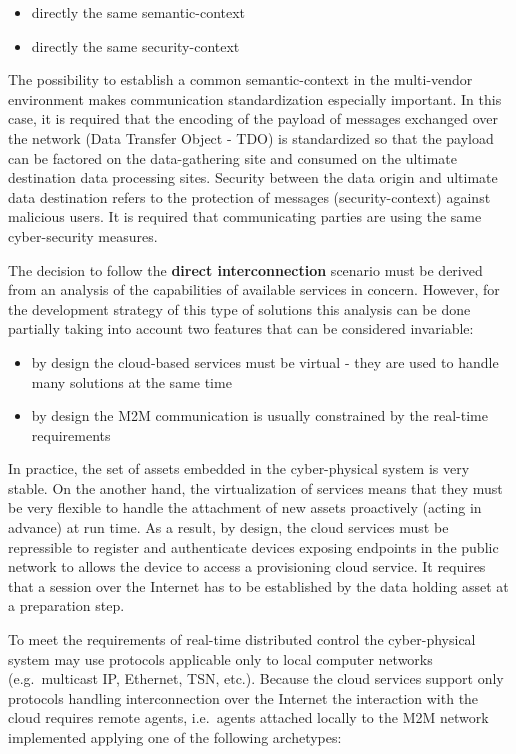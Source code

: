 \documentclass{jacsart}
\providecommand{\tightlist} { \setlength{\itemsep}{0pt}\setlength{\parskip}{0pt}}
\begin{document}
\begin{itemize}
\tightlist
\item
  directly the same semantic-context
\item
  directly the same security-context
\end{itemize}

The possibility to establish a common semantic-context in the
multi-vendor environment makes communication standardization especially
important. In this case, it is required that the encoding of the payload
of messages exchanged over the network (Data Transfer Object - TDO) is
standardized so that the payload can be factored on the data-gathering
site and consumed on the ultimate destination data processing sites.
Security between the data origin and ultimate data destination refers to
the protection of messages (security-context) against malicious users.
It is required that communicating parties are using the same
cyber-security measures.

The decision to follow the \textbf{direct interconnection} scenario must
be derived from an analysis of the capabilities of available services in
concern. However, for the development strategy of this type of solutions
this analysis can be done partially taking into account two features
that can be considered invariable:

\begin{itemize}
\tightlist
\item
  by design the cloud-based services must be virtual - they are used to
  handle many solutions at the same time
\item
  by design the M2M communication is usually constrained by the
  real-time requirements
\end{itemize}

In practice, the set of assets embedded in the cyber-physical system is
very stable. On the another hand, the virtualization of services means
that they must be very flexible to handle the attachment of new assets
proactively (acting in advance) at run time. As a result, by design, the
cloud services must be repressible to register and authenticate devices
exposing endpoints in the public network to allows the device to access
a provisioning cloud service. It requires that a session over the
Internet has to be established by the data holding asset at a
preparation step.

To meet the requirements of real-time distributed control the
cyber-physical system may use protocols applicable only to local
computer networks (e.g.~multicast IP, Ethernet, TSN, etc.). Because the
cloud services support only protocols handling interconnection over the
Internet the interaction with the cloud requires remote agents,
i.e.~agents attached locally to the M2M network implemented applying one
of the following archetypes:
\end{document}
